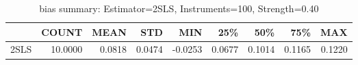 \begin{table}[ht]
\centering
\caption{bias summary: Estimator=2SLS, Instruments=100, Strength=0.40}
\begin{tabular}{lrrrrrrrr}
\toprule
 & COUNT & MEAN & STD & MIN & 25\% & 50\% & 75\% & MAX \\
\midrule
2SLS & 10.0000 & 0.0818 & 0.0474 & -0.0253 & 0.0677 & 0.1014 & 0.1165 & 0.1220 \\
\bottomrule
\end{tabular}
\end{table}
